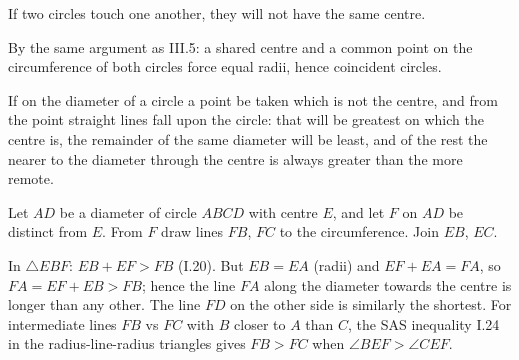 \begin{claim}
\label{prop:III.6}
If two circles touch one another, they will not have the same centre.
\end{claim}
\begin{evidence}
\label{ev:III.6}
By the same argument as III.5: a shared centre and a common point on
the circumference of both circles force equal radii, hence coincident
circles.
\end{evidence}

\begin{claim}
\label{prop:III.7}
If on the diameter of a circle a point be taken which is not the
centre, and from the point straight lines fall upon the circle: that
will be greatest on which the centre is, the remainder of the same
diameter will be least, and of the rest the nearer to the diameter
through the centre is always greater than the more remote.
\end{claim}
\begin{evidence}
\label{ev:III.7}
Let $AD$ be a diameter of circle $ABCD$ with centre $E$, and let
$F$ on $AD$ be distinct from $E$.  From $F$ draw lines $FB$, $FC$
to the circumference.  Join $EB$, $EC$.

In $\triangle EBF$: $EB + EF > FB$ (I.20).  But $EB = EA$ (radii)
and $EF + EA = FA$, so $FA = EF + EB > FB$; hence the line $FA$
along the diameter towards the centre is longer than any other.
The line $FD$ on the other side is similarly the shortest.  For
intermediate lines $FB$ vs $FC$ with $B$ closer to $A$ than $C$,
the SAS inequality I.24 in the radius-line-radius triangles gives
$FB > FC$ when $\angle BEF > \angle CEF$.
\end{evidence}

